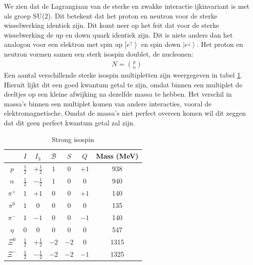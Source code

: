 \documentclass[../main.tex]{subfiles}
\begin{document}
We zien dat de Lagrangiaan van de sterke en zwakke interactie ijkinvariant is met als groep SU(2). Dit betekent dat het proton en neutron voor de sterke wisselwerking identiek zijn. Dit komt neer op het feit dat voor de sterke wisselwerking de up en down quark identiek zijn. Dit is niets anders dan het analogon voor een elektron met spin up $\left|e^\uparrow\right>$ en spin down $\left|e^\downarrow\right>$. Het proton en neutron vormen samen een sterk isospin doublet, de nucleonen:
\begin{equation}
    \begin{aligned}
        \label{eq:nucleonen}
        N = \binom{p}{n}
    \end{aligned}
\end{equation}
Een aantal verschillende sterke isospin multipletten zijn weergegeven in tabel \ref{tab:strong_isospin}. Hieruit lijkt dit een goed kwantum getal te zijn, omdat binnen een multiplet de deeltjes op een kleine afwijking na dezelfde massa te hebben. Het verschil in massa's binnen een multiplet komen van andere interacties, vooral de elektromagnetische. Omdat de massa's niet perfect overeen komen wil dit zeggen dat dit geen perfect kwantum getal zal zijn.

\begin{table}[h]
    \centering
    \caption{Strong isospin}
    \label{tab:strong_isospin}
    \begin{tabular}{c||cc|c|c|c|c}
                & $I$           & $I_3$         & $\mathcal{B}$ & $S$   & $Q$   & Mass (MeV)\\
        \hline
        $p$     & $\frac{1}{2}$ & $+\frac{1}{2}$& $1$           & $0$   & $+1$  & 938       \\
        $n$     & $\frac{1}{2}$ & $-\frac{1}{2}$& $1$           & $0$   & $0$   & 940       \\
        \hline
        $\pi^+$ & $1$           & $+1$          & $0$           & $0$   & $+1$  & 140       \\
        $\pi^0$ & $1$           & $0$           & $0$           & $0$   & $0$   & 135       \\
        $\pi^-$ & $1$           & $-1$          & $0$           & $0$   & $-1$  & 140       \\
        \hline
        $\eta$  & $0$           & $0$           & $0$           & $0$   & $0$   & 547       \\
        \hline
        $\Xi^0$ & $\frac{1}{2}$ & $+\frac{1}{2}$& $-2$          & $-2$  & $0$   & 1315      \\
        $\Xi^-$ & $\frac{1}{2}$ & $-\frac{1}{2}$& $-2$          & $-2$  & $-1$  & 1325      \\
    \end{tabular}
\end{table}
\end{document}
